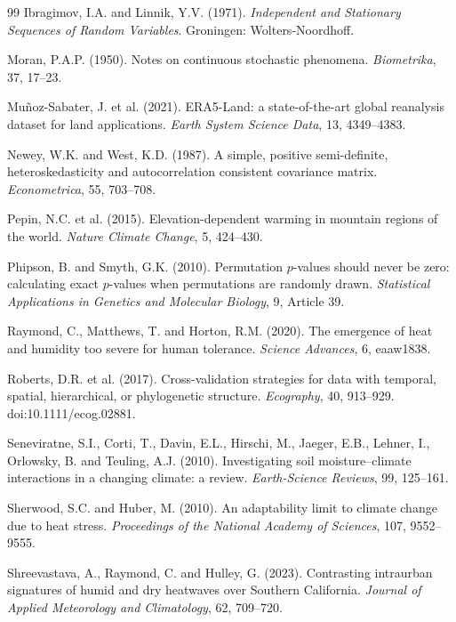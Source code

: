 \documentclass[namedate,webpdf,modern,mediumone]{oup-authoring-template}
\begin{document}
\begin{thebibliography}{99}
Ibragimov, I.A. and Linnik, Y.V. (1971). \textit{Independent and Stationary
Sequences of Random Variables}. Groningen: Wolters-Noordhoff.

Moran, P.A.P. (1950). Notes on continuous stochastic phenomena.
\textit{Biometrika}, 37, 17--23.

Mu\~noz-Sabater, J. et al. (2021). ERA5-Land: a state-of-the-art global
reanalysis dataset for land applications. \textit{Earth System Science Data},
13, 4349--4383.

Newey, W.K. and West, K.D. (1987). A simple, positive semi-definite,
heteroskedasticity and autocorrelation consistent covariance matrix.
\textit{Econometrica}, 55, 703--708.

Pepin, N.C. et al. (2015). Elevation-dependent warming in mountain regions
of the world. \textit{Nature Climate Change}, 5, 424--430.

Phipson, B. and Smyth, G.K. (2010). Permutation $p$-values should never be
zero: calculating exact $p$-values when permutations are randomly drawn.
\textit{Statistical Applications in Genetics and Molecular Biology}, 9,
Article 39.

Raymond, C., Matthews, T. and Horton, R.M. (2020). The emergence of heat and
humidity too severe for human tolerance. \textit{Science Advances}, 6,
eaaw1838.

Roberts, D.R. et al. (2017). Cross-validation strategies for data with temporal,
spatial, hierarchical, or phylogenetic structure. \textit{Ecography}, 40,
913--929. doi:10.1111/ecog.02881.

Seneviratne, S.I., Corti, T., Davin, E.L., Hirschi, M., Jaeger, E.B.,
Lehner, I., Orlowsky, B. and Teuling, A.J. (2010). Investigating soil
moisture--climate interactions in a changing climate: a review.
\textit{Earth-Science Reviews}, 99, 125--161.

Sherwood, S.C. and Huber, M. (2010). An adaptability limit to climate change
due to heat stress. \textit{Proceedings of the National Academy of Sciences},
107, 9552--9555.

Shreevastava, A., Raymond, C. and Hulley, G. (2023). Contrasting intraurban
signatures of humid and dry heatwaves over Southern California.
\textit{Journal of Applied Meteorology and Climatology}, 62, 709--720.


\end{thebibliography}
\end{document}
